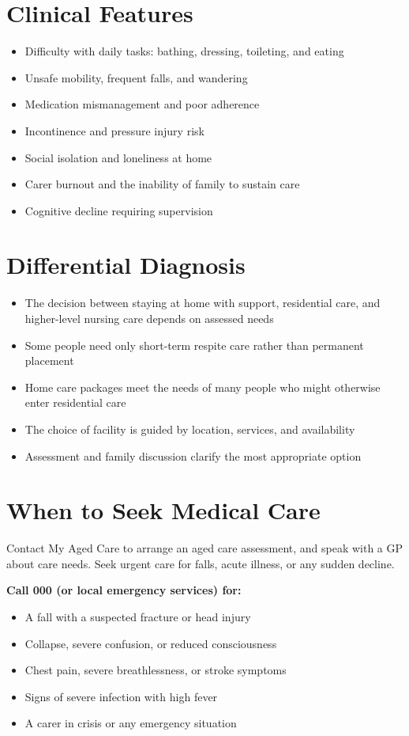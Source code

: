 \section*{Clinical Features}
\begin{itemize}
    \item Difficulty with daily tasks: bathing, dressing, toileting, and eating
    \item Unsafe mobility, frequent falls, and wandering
    \item Medication mismanagement and poor adherence
    \item Incontinence and pressure injury risk
    \item Social isolation and loneliness at home
    \item Carer burnout and the inability of family to sustain care
    \item Cognitive decline requiring supervision
\end{itemize}

\section*{Differential Diagnosis}
\begin{itemize}
    \item The decision between staying at home with support, residential care, and higher-level nursing care depends on assessed needs
    \item Some people need only short-term respite care rather than permanent placement
    \item Home care packages meet the needs of many people who might otherwise enter residential care
    \item The choice of facility is guided by location, services, and availability
    \item Assessment and family discussion clarify the most appropriate option
\end{itemize}

\section*{When to Seek Medical Care}
Contact My Aged Care to arrange an aged care assessment, and speak with a GP about care needs. Seek urgent care for falls, acute illness, or any sudden decline.

\textbf{Call 000 (or local emergency services) for:}
\begin{itemize}
    \item A fall with a suspected fracture or head injury
    \item Collapse, severe confusion, or reduced consciousness
    \item Chest pain, severe breathlessness, or stroke symptoms
    \item Signs of severe infection with high fever
    \item A carer in crisis or any emergency situation
\end{itemize}

